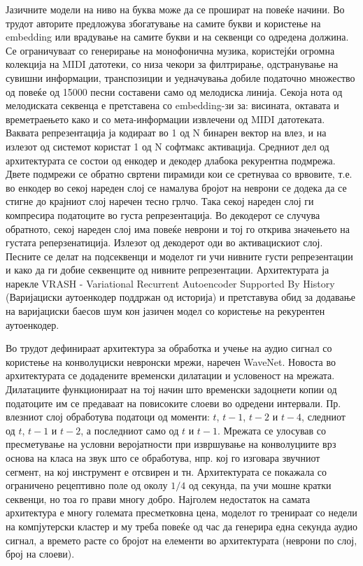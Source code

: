 Јазичните модели на ниво на буква може да се прошират на повеќе начини. Во трудот \cite{Tikhonov2017} авторите предложува збогатување на самите букви и користење на embedding или врадување на самите букви и на секвенци со одредена должина. Се ограничуваат со генерирање на монофонична музика, користејќи огромна колекција на MIDI датотеки, со низа чекори за филтрирање, одстранување на сувишни информации, транспозиции и уедначувања добиле податочно множество од повеќе од 15000 песни составени само од мелодиска линија. Секоја нота од мелодиската секвенца е претставена со embedding-зи за: висината, октавата и времетраењето како и со мета-информации извлечени од MIDI датотеката. Ваквата репрезентација ја кодираат во 1 од N бинарен вектор на влез, и на излезот од системот користат 1 од N софтмакс активација. Средниот дел од архитектурата се состои од енкодер и декодер длабока рекурентна подмрежа. Двете подмрежи се обратно свртени пирамиди кои се сретнуваа со врвовите, т.е. во енкодер во секој нареден слој се намалува бројот на неврони се додека да се стигне до крајниот слој наречен тесно грлчо. Така секој нареден слој ги компресира податоците во густа репрезентација. Во декодерот се случува обратното, секој нареден слој има повеќе неврони и тој го открива значењето на густата реперзенатиција. Излезот од декодерот оди во активацискиот слој. Песните се делат на подсеквенци и моделот ги учи нивните густи репрезентации и како да ги добие секвенците од нивните репрезентации. Архитектурата ја нарекле VRASH - Variational Recurrent Autoencoder Supported By History (Варијациски аутоенкодер поддржан од историја) и претставува обид за додавање на варијациски баесов шум кон јазичен модел со користење на рекурентен аутоенкодер.

Во трудот \cite{Oord2016} дефинираат архитектура за обработка и учење на аудио сигнал со користење на конволуциски невронски мрежи, наречен WaveNet. Новоста во архитектурата се додадените временски дилатации и условеност на мрежата. Дилатациите функционираат на тој начин што временски задоцнети копии од податоците им се предаваат на повисоките слоеви во одредени интервали. Пр. влезниот слој обработува податоци од моменти: $t$, $t-1$, $t-2$ и $t-4$, следниот од $t$, $t-1$ и $t-2$, а последниот само од $t$ и $t-1$. Мрежата се улосував со пресметување на условни веројатности при извршување на конволуциите врз основа на класа на звук што се обработува, нпр. кој го изговара звучниот сегмент, на кој инструмент е отсвирен и тн. Архитектурата се покажала со ограничено рецептивно поле од околу $1/4$ од секунда, па учи мошне кратки секвенци, но тоа го прави многу добро. Најголем недостаток на самата архитектура е многу големата пресметковна цена, моделот го тренираат со недели на компјутерски кластер и му треба повеќе од час да генерира една секунда аудио сигнал, а времето расте со бројот на елементи во архитектурата (неврони по слој, број на слоеви).

